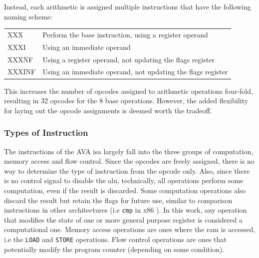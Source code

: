 Instead, each arithmetic is assigned multiple instructions that have the following naming scheme:

\begin{table}[H]
    \centering
    \begin{tabular}{ll}
        XXX    & Perform the base instruction, using a register operand       \\
        XXXI   & Using an immediate operand                                   \\
        XXXNF  & Using a register operand, not updating the flags register    \\
        XXXINF & Using an immediate operand, not updating the flags register 
    \end{tabular}    
    \label{tab:instruction_suffices}
\end{table}

This increases the number of opcodes assigned to arithmetic operations four-fold, resulting in 32 opcodes for the 8 base operations. However, the added flexibility for laying out the opcode assignments is deemed worth the tradeoff.

\subsubsection{Types of Instruction}

The instructions of the AVA \ac{isa} largely fall into the three groups of computation, memory access and flow control. Since the opcodes are freely assigned, there is no way to determine the type of instruction from the opcode only. Also, since there is no control signal to disable the \ac{alu}, technically, all operations perform some computation, even if the result is discarded. Some computation operations also discard the result but retain the flags for future use, similar to comparison instructions in other architectures (i.e \texttt{cmp} in x86 \cite{intelASM86Manual1983}). In this work, any operation that modifies the state of one or more general purpose register is considered a computational one. Memory access operations are ones where the \ac{ram} is accessed, i.e the \texttt{LOAD} and \texttt{STORE} operations. Flow control operations are ones that potentially modify the program counter (depending on some condition).



